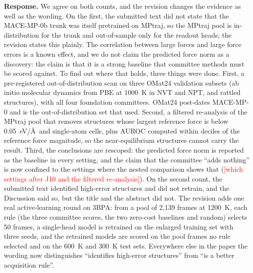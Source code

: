 \documentclass[11pt]{article}
\providecommand{\fsTODO}[1]{\textcolor{red}{[#1]}}
\newcommand{\response}{\medskip\noindent\textbf{Response.} }
\begin{document}
\response
We agree on both counts, and the revision changes the evidence as well as the
wording. On the first, the submitted text did not state that the MACE-MP-0b
trunk was itself pretrained on MPtraj, so the MPtraj pool is in-distribution
for the trunk and out-of-sample only for the readout heads; the revision
states this plainly. The correlation between large forces and large force
errors is a known effect, and we do not claim the predicted force norm as a
discovery: the claim is that it is a strong baseline that committee methods
must be scored against. To find out where that holds, three things were done.
First, a pre-registered out-of-distribution scan on three OMat24 validation
subsets (ab initio molecular dynamics from PBE at 1000~K in NVT and NPT, and
rattled structures), with all four foundation committees. OMat24 post-dates
MACE-MP-0 and is the out-of-distribution set that \citet{beck2025committee}
used. Second, a filtered re-analysis of the MPtraj pool that removes
structures whose largest reference force is below 0.05~eV/\AA\ and single-atom
cells, plus AUROC computed within deciles of the reference force magnitude,
so the near-equilibrium structures cannot carry the result. Third, the
conclusions are rescoped: the predicted force norm is reported as the baseline
in every setting, and the claim that the committee ``adds nothing'' is now
confined to the settings where the nested comparison shows that
(\fsTODO{which settings after J10 and the filtered re-analysis}). On the
second count, the submitted text identified high-error structures and did not
retrain, and the Discussion said so, but the title and the abstract did not.
The revision adds one real active-learning round on 3BPA: from a pool of 2,139
frames at 1200~K, each rule (the three committee scores, the two zero-cost
baselines and random) selects 50 frames, a single-head model is retrained on
the enlarged training set with three seeds, and the retrained models are
scored on the pool frames no rule selected and on the 600~K and 300~K test
sets. Everywhere else in the paper the wording now distinguishes
``identifies high-error structures'' from ``is a better acquisition rule''.
\end{document}
